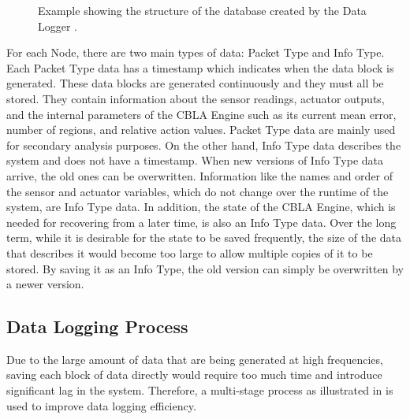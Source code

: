 \begin{figure}
	\caption[Structure of the database created by Data Logger]{Example showing the structure of the database created by the Data Logger .}
	\label{fig:data_structure}
\end{figure}

For each Node, there are two main types of data: Packet Type and Info Type. Each Packet Type data has a timestamp which indicates when the data block is generated. These data blocks are generated continuously and they must all be stored. They contain information about the sensor readings, actuator outputs, and the internal parameters of the CBLA Engine such as its current mean error, number of regions, and relative action values. Packet Type data are mainly used for secondary analysis purposes. On the other hand, Info Type data describes the system and does not have a timestamp. When new versions of Info Type data arrive, the old ones can be overwritten. Information like the names and order of the sensor and actuator variables, which do not change over the runtime of the system, are Info Type data. In addition, the state of the CBLA Engine, which is needed for recovering from a later time, is also an Info Type data. Over the long term, while it is desirable for the state to be saved frequently, the size of the data that describes it would become too large to allow multiple copies of it to be stored. By saving it as an Info Type, the old version can simply be overwritten by a newer version.

\subsection{Data Logging Process}

Due to the large amount of data that are being generated at high frequencies, saving each block of data directly would require too much time and introduce significant lag in the system. Therefore, a multi-stage process as illustrated in  is used to improve data logging efficiency.

